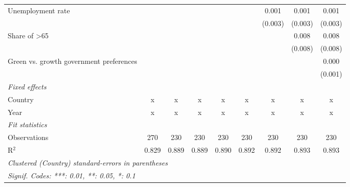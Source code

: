 \begin{table}[htbp]
\begin{tabular}{lcccccccc}
      Unemployment rate                                      &         &         &         &         &         & 0.001   & 0.001   & 0.001\\   
                                                             &         &         &         &         &         & (0.003) & (0.003) & (0.003)\\   
      Share of >65                                           &         &         &         &         &         &         & 0.008   & 0.008\\   
                                                             &         &         &         &         &         &         & (0.008) & (0.008)\\   
      Green vs. growth government preferences                &         &         &         &         &         &         &         & 0.000\\   
                                                             &         &         &         &         &         &         &         & (0.001)\\   
      \emph{Fixed effects}\\
      Country                                                & x       & x       & x       & x       & x       & x       & x       & x\\  
      Year                                                   & x       & x       & x       & x       & x       & x       & x       & x\\  
      \midrule \emph{Fit statistics}\\
      Observations                                           & 270     & 230     & 230     & 230     & 230     & 230     & 230     & 230\\  
      R$^2$                                                  & 0.829   & 0.889   & 0.889   & 0.890   & 0.892   & 0.892   & 0.893   & 0.893\\  
      \midrule
      \multicolumn{9}{l}{\emph{Clustered (Country) standard-errors in parentheses}}\\
      \multicolumn{9}{l}{\emph{Signif. Codes: ***: 0.01, **: 0.05, *: 0.1}}\\
   \end{tabular}
\end{table}


